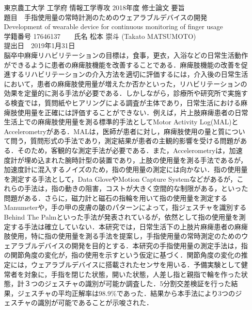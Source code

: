 \thispagestyle{empty}
\begin{center}
	{\large 東京農工大学 工学府 情報工学専攻 2018年度 修士論文 要旨}\\
	\vspace{8mm}
	{\Large 題目　手指使用量の常時計測のためのウェアラブルデバイスの開発}\\
	\vspace{2mm}
	{\large Development of wearable device for continuous monitoring of finger usage}\\
	\vspace{8mm}
	{\large 学籍番号 17646137　　氏名 松本 崇斗 (Takato MATSUMOTO)}\\
	\vspace{2mm}
	{\large 提出日　2019年1月31日}\\
	\vspace{4mm}
脳卒中麻痺リハビリテーションの目標は，食事，更衣，入浴などの日常生活動作ができるように患者の麻痺肢機能を改善することである．麻痺肢機能の改善を促進するリハビリテーションの介入方法を適切に評価するには，介入後の日常生活において，患者の麻痺肢使用量が増えたか否かといった，リハビリテーションの効果を定量的に測る手法が必要である．しかしながら，診療所や研究所で実施する検査では，質問紙やヒアリングによる調査が主体であり，日常生活における麻痺肢使用量を正確には評価することができない．例えば，片上肢麻痺患者の日常生活上での麻痺肢使用量を測る標準的手法としてMotor Activity Log(MAL)とAccelerometryがある．MALは，医師が患者に対し，麻痺肢使用の量と質について問う，質問形式の手法であり，測定結果が患者の主観的影響を受ける問題がある．そのため，客観的な測定手法が必要である．また，Accelerometryは，加速度計が埋め込まれた腕時計型の装置であり，上肢の使用量を測る手法であるが，加速度計に混入するノイズのため，指の使用量の測定には向かない．指の使用量を測定する手法として，Data GloveやMotion Capture Systemなどがあるが，これらの手法は，指の動きの阻害，コストが大きく空間的な制限がある，といった問題がある．さらに，磁力計と磁石の指輪を用いて指の使用量を測定するManumeterや，手の甲の皮膚の皺のパターンによって，指ジェスチャを識別するBehind The Palmといった手法が発表されているが，依然として指の使用量を測定する手法は確立していない．本研究では，日常生活下の上肢片麻痺患者の麻痺肢使用，特に指の使用量を測る手法を提案し，手指使用量の常時測定のためのウェアラブルデバイスの開発を目的とする．本研究の手指使用量の測定手法は，指の関節角度の変化が，指の使用を示すという仮定に基づく．関節角度の変化の推定には，ウェアラブルデバイスに搭載されたセンサを用いる．予備実験として健常者を対象に，手指を閉じた状態，開いた状態，人差し指と親指で輪を作った状態，計３つのジェスチャの識別が可能か調査した．5分割交差検証を行った結果，ジェスチャの平均正解率は98.9\%であった．結果から本手法により3つのジェスチャの識別が可能であることが示唆された．
\end{center}













